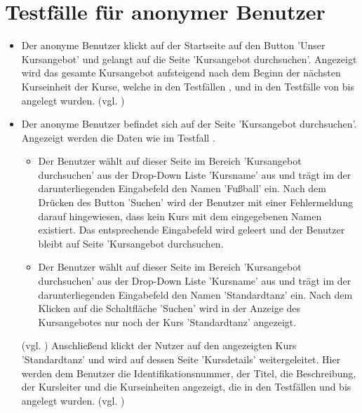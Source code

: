 \documentclass[a4paper]{scrreprt}
\newcounter{Lc}
\newcounter{Hc}
\newcommand{\stepHc}{\stepcounter{Hc}\setcounter{Lc}{0}}
\begin{document}
	\section{Testfälle für anonymer Benutzer}
			\stepHc
			\begin{itemize}
				\item {} 
				 Der anonyme Benutzer klickt auf der Startseite auf den Button 'Unser Kursangebot' und gelangt auf die Seite 'Kursangebot durchsuchen'. Angezeigt wird das gesamte Kursangebot aufsteigend nach dem Beginn der nächsten Kurseinheit der Kurse, welche in den Testfällen ,  und in den Testfälle von  bis  angelegt wurden. (vgl. ) 
				 
				 \item {} 
				 Der anonyme Benutzer befindet sich auf der Seite 'Kursangebot durchsuchen'. Angezeigt werden die Daten wie im Testfall . 
					 \begin{itemize}
					 \item Der Benutzer wählt auf dieser Seite im Bereich 'Kursangebot durchsuchen' aus der Drop-Down Liste 'Kursname' aus und trägt im der darunterliegenden Eingabefeld den Namen 'Fußball' ein. Nach dem Drücken des Button 'Suchen' wird der Benutzer mit einer Fehlermeldung darauf hingewiesen, dass kein Kurs mit dem eingegebenen Namen existiert. Das entsprechende Eingabefeld wird geleert und der Benutzer bleibt auf Seite 'Kursangebot durchsuchen.
					 
					 \item  Der Benutzer wählt auf dieser Seite im Bereich 'Kursangebot durchsuchen' aus der Drop-Down Liste 'Kursname' aus und trägt im der darunterliegenden Eingabefeld den Namen 'Standardtanz' ein. Nach dem Klicken auf die Schaltfläche 'Suchen' wird in der Anzeige des Kursangebotes nur noch der Kurs 'Standardtanz' angezeigt.
					\end{itemize}
				(vgl. )	
				Anschließend klickt der Nutzer auf den angezeigten Kurs 'Standardtanz' und wird auf dessen Seite 'Kursdetails' weitergeleitet. Hier werden dem Benutzer die Identifikationsnummer, der Titel, die Beschreibung, der Kursleiter und die Kurseinheiten angezeigt, die in den Testfällen  und  bis  angelegt wurden. (vgl. ) 
				

\end{itemize}
\end{document}
